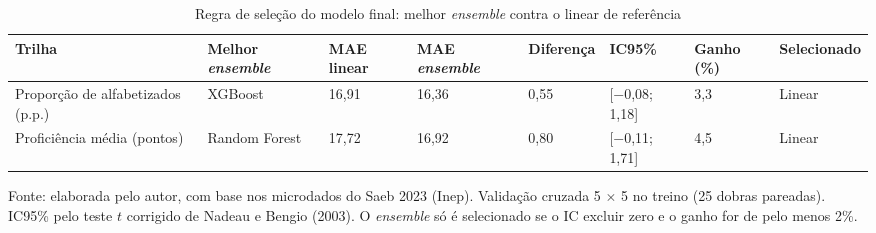 \begin{table}[H]
    \centering
    \footnotesize
    \caption{Regra de seleção do modelo final: melhor \textit{ensemble} contra o linear de referência}
    \begin{tabular}{L{3.0cm}C{1.6cm}C{1.2cm}C{1.3cm}C{1.1cm}C{1.9cm}C{1.1cm}C{1.3cm}}
        \toprule
        \textbf{Trilha} & \textbf{Melhor \textit{ensemble}} & \textbf{MAE linear} & \textbf{MAE \textit{ensemble}} & \textbf{Diferença} & \textbf{IC95\%} & \textbf{Ganho (\%)} & \textbf{Selecionado} \\
        \midrule
        Proporção de alfabetizados (p.p.) & XGBoost & 16,91 & 16,36 & 0,55 & [$-$0,08; 1,18] & 3,3 & Linear \\
        Proficiência média (pontos) & Random Forest & 17,72 & 16,92 & 0,80 & [$-$0,11; 1,71] & 4,5 & Linear \\
        \bottomrule
    \end{tabular}
    \vspace{0.1cm}
    \begin{flushleft}
    {\footnotesize Fonte: elaborada pelo autor, com base nos microdados do Saeb 2023 (Inep). Validação cruzada 5 $\times$ 5 no treino (25 dobras pareadas). IC95\% pelo teste $t$ corrigido de Nadeau e Bengio (2003). O \textit{ensemble} só é selecionado se o IC excluir zero e o ganho for de pelo menos 2\%.}
    \end{flushleft}
    \label{tab:selecao}
\end{table}
